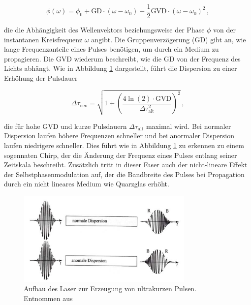       \begin{equation}
        \phi(\omega) = \phi_0 + \text{GD} \cdot \left(\omega-\omega_0\right) + \frac{1}{2} \text{GVD} \cdot \left(\omega-\omega_0\right)^2 \,,
      \end{equation}
      
      die die Abhängigkeit des Wellenvektors beziehungsweise der Phase $\phi$ von der instantanen Kreisfrequenz $\omega$ angibt. Die Gruppenverzögerung (GD) gibt an, wie lange Frequenzanteile eines Pulses
      benötigen, um durch ein Medium zu propagieren. Die GVD wiederum beschreibt, wie die GD von der Frequenz des Lichts abhängt. Wie in Abbildung \ref{fig:Dispersion} dargestellt, führt die Dispersion zu
      einer Erhöhung der Pulsdauer

      \begin{equation}
        \Delta\tau_{\text{neu}} = \sqrt{1 + \left(\frac{4\ln\left(2\right)\cdot \text{GVD}}{\Delta\tau_{\text{alt}}^2}\right)^2} \, ,
      \end{equation}
      
      die für hohe GVD und kurze Pulsdauern $\Delta\tau_{\text{alt}}$ maximal wird.
      Bei normaler Dispersion laufen höhere Frequenzen schneller und bei anormaler Dispersion laufen niedrigere schneller. Dies führt wie in Abbildung \ref{fig:Dispersion} zu
      erkennen zu einem sogennaten Chirp, der die Änderung der Frequenz eines Pulses entlang seiner Zeitskala beschreibt. Zusätzlich tritt in dieser Faser auch der nicht-lineare Effekt der 
      Selbstphasenmodulation auf, der die Bandbreite des Pulses bei Propagation durch ein nicht lineares Medium wie Quarzglas erhöht.
  

      \FloatBarrier
      \begin{figure}[h]
        \centering
        \includegraphics[width = 0.77\textwidth]{pictures/Dispersion.png}
        \caption{Aufbau des Laser zur Erzeugung von ultrakurzen Pulsen. Entnommen aus \cite{jostmeier_koharente_2012}}
        \label{fig:Dispersion}
      \end{figure}
      \FloatBarrier


